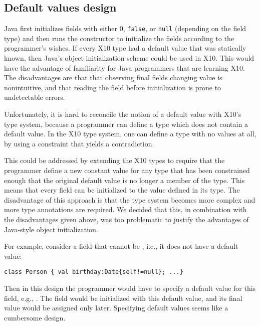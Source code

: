 

\subsection{Default values design}

Java first initializes fields with either $0$, \texttt{false}, or \texttt{null}
(depending on the field type) and then runs the constructor to initialize
the fields according to the programmer's wishes.  If every X10 type had a
default value that was statically known, then Java's object initialization
scheme could be used in X10.  This would have the advantage of familiarity for
Java programmers that are learning X10.  The disadvantages are that that
observing final fields changing value is nonintuitive, and that reading the
field before initialization is prone to undetectable errors.

Unfortunately, it is hard to reconcile the notion of a default value with X10's
type system, because a programmer can define a type which does not contain a
default value.  In the X10 type system, one can define a type with no values at
all, by using a constraint that yields a contradiction.

This could be addressed by extending the X10 types to require that the
programmer define a new constant value for any type that has been constrained
enough that the original default value is no longer a member of the type.  This
means that every field can be initialized to the value defined in its type.  The
disadvantage of this approach is that the type system becomes more complex and more type
annotations are required.  We decided that this, in combination with the
disadvantages given above, was too problematic to justify the advantages of
Java-style object initialization.

For example, consider a field  that cannot be , i.e., it does not have a default value:
\vspace{-0.2cm}\begin{lstlisting}
class Person { val birthday:Date{self!=null}; ...}
\end{lstlisting}\vspace{-0.2cm}
Then in this design the programmer would have to specify a default value for this field,
    e.g., .
The field would be initialized with this default value, and its final value would be assigned only later.
Specifying default values seems like a cumbersome design.

